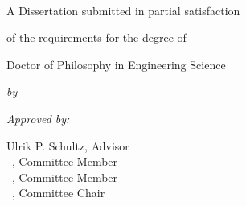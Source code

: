 \begin{titlepage}
	\centering
	{\large \publisher\par}
	~

	\vspace{36pt}
	{\Huge{}\selectfont\bfseries\booktitle\par}
	\vspace{24pt}

	{\large A Dissertation submitted in partial satisfaction\par 
	of the requirements for the degree of\par 
	Doctor of Philosophy in Engineering Science}

	\vspace{12pt}
	{\large\itshape by\par}
	\vspace{6pt}
	{\Large\itshape \authorname\par}
	\vspace{24pt}

	{\small\begin{flushleft}{\itshape Approved by:}
		\begin{multicols}{2}
			{Ulrik P. Schultz, Advisor\\
			~, Committee Member\\
			~, Committee Member\\
			~, Committee Chair\\
			}\par
			\columnbreak
			{~\\
			~\\
			~}\par
		\end{multicols}
		\vspace{6pt}
		\begin{multicols}{2}
		~\\\columnbreak {\itshape %
		                }
		\end{multicols}	
	\end{flushleft}}

	{\large \editionyear{}}
\end{titlepage}

